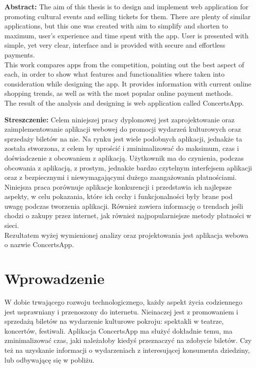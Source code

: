 \documentclass[12pt]{article}
\begin{document}
\begin{sloppypar}


\tableofcontents
\newpage

\textbf{Abstract:}
The aim of this thesis is to design and implement web application for promoting cultural events and selling tickets for them. 
There are plenty of similar applications, but this one was created with aim to simplify and shorten to maximum, user's experience and time spent with the app.
User is presented with simple, yet very clear, interface and is provided with secure and effortless payments. \\
This work compares apps from the competition, pointing out the best aspect of each, in order to show what features and functionalities where taken into 
consideration while designing the app. It provides information with current online shopping trends, as well as
with the most popular online payment methods.\\
The result of the analysis and designing is web application called ConcertsApp.

\bigbreak
\textbf{Streszczenie:}
Celem niniejszej pracy dyplomowej jest zaprojektowanie oraz zaimplementowanie aplikacji webowej do promocji wydarzeń kulturowych oraz sprzedaży biletów na nie.
Na rynku jest wiele podobnych aplikacji, jednakże ta została stworzona, z celem by uprościć i zminimalizować do maksimum, 
czas i doświadczenie z obcowaniem z aplikacją.
Użytkownik ma do czynienia, podczas obcowania z aplikacją, z prostym, jednakże bardzo czytelnym interfejsem aplikacji oraz z bezpiecznymi i niewymagającymi 
dużego zaangażowania płatnościami.\\
Niniejsza praca porównuje aplikacje konkurencji i przedstawia ich najlepsze aspekty, 
w celu pokazania, które ich cechy i funkcjonalności były brane pod uwagę podczas tworzenia aplikacji. 
Również zawiera informację o trendach jeśli chodzi o zakupy przez internet, jak również najpopularniejsze metody płatności w sieci.\\
Rezultatem wyżej wymienionej analizy oraz projektowania jest aplikacja webowa o nazwie ConcertsApp.

\section{Wprowadzenie}
{
  W dobie trwającego rozwoju technologicznego, każdy aspekt życia codziennego jest usprawniany i przenoszony
  do internetu. Nieinaczej jest z promowaniem i sprzedażą biletów na wydarzenie kulturowe pokroju:
  spektakli w teatrze, koncertów, festiwali. Aplikacja ConcertsApp ma służyć dokładnie temu,
  ma zminimalizować czas, jaki należałoby kiedyś przeznaczyć na zdobycie biletów. Czy też na uzyskanie
  informacji o wydarzeniach z interesującej konsumenta dziedziny, lub odbywającę się w pobliżu.
}
\end{sloppypar}
\end{document}
